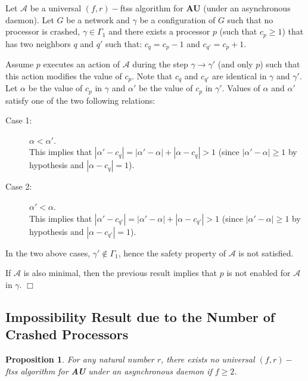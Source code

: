 \documentclass[11pt,english,letterpaper]{article}
\newtheorem{proposition}{Proposition}
\newenvironment{proof}{{\noindent\bf Proof. } }{{\hfill $\Box$}}
\begin{document}
\begin{proof}
Let $\mathcal{A}$ be a universal $(f,r)-$ftss algorithm for \textbf{AU} (under an asynchronous daemon). Let $G$ be a network and $\gamma$ be a configuration of $G$ such that no processor is crashed, $\gamma\in\Gamma_{1}$ and there exists a processor $p$ (such that $c_{p}\geq 1$) that has two neighbors $q$ and $q'$ such that: $c_{q}=c_{p}-1$ and $c_{q'}=c_{p}+1$.

Assume $p$ executes an action of $\mathcal{A}$ during the step $\gamma\longrightarrow\gamma'$ (and only $p$) such that this action modifies the value of $c_{p}$. Note that $c_{q}$ and $c_{q'}$ are identical in $\gamma$ and $\gamma'$. Let $\alpha$ be the value of $c_{p}$ in $\gamma$ and $\alpha'$ be the value of $c_{p}$ in $\gamma'$. Values of $\alpha$ and $\alpha'$ satisfy one of the two following relations:

\begin{description}
\item[Case 1:] $\alpha<\alpha'$.\\
This implies that $|\alpha'-c_{q}|=|\alpha'-\alpha|+|\alpha-c_{q}|>1$ (since $|\alpha'-\alpha|\geq 1$ by hypothesis and $|\alpha-c_{q}|=1$).
\item[Case 2:] $\alpha'<\alpha$.\\
This implies that $|\alpha'-c_{q'}|=|\alpha'-\alpha|+|\alpha-c_{q'}|>1$ (since $|\alpha'-\alpha|\geq 1$ by hypothesis and $|\alpha-c_{q'}|=1$).
\end{description} 

In the two above cases, $\gamma'\notin\Gamma_{1}$, hence the safety property of $\mathcal{A}$ is not satisfied.

If $\mathcal{A}$ is also minimal, then the previous result implies that  $p$ is not enabled for $\mathcal{A}$ in $\gamma$.
\end{proof}

\subsection{Impossibility Result due to the Number of Crashed Processors}

\begin{proposition}\label{prop:impf2}
For any natural number $r$, there exists no universal $(f,r)-$ftss algorithm for \textbf{AU} under an asynchronous daemon if $f\geq 2$.
\end{proposition}
\end{document}

